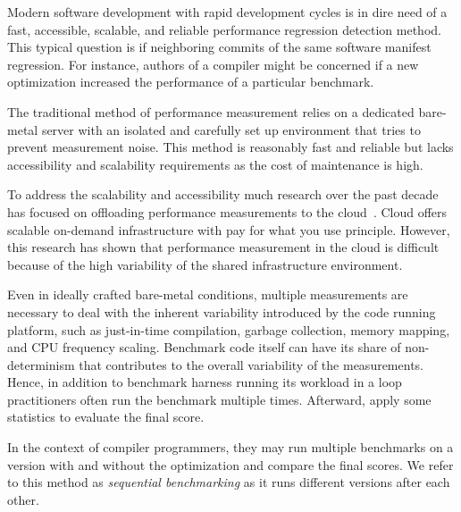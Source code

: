 
Modern software development with rapid development cycles is in dire need of a fast, accessible, scalable, and reliable performance regression detection method.
This typical question is if neighboring commits of the same software manifest regression.
For instance, authors of a compiler might be concerned if a new optimization increased the performance of a particular benchmark.

The traditional method of performance measurement relies on a dedicated bare-metal server with an isolated and carefully set up environment that tries to prevent measurement noise.
This method is reasonably fast and reliable but lacks accessibility and scalability requirements as the cost of maintenance is high.

To address the scalability and accessibility much research over the past decade has focused on offloading performance measurements to the cloud~\cite{leitner2016patterns, laaber2019software, abedi2017conducting}.
Cloud offers scalable \mbox{on-demand} infrastructure with pay for what you use principle.
However, this research has shown that performance measurement in the cloud is difficult because of the high variability of the shared infrastructure environment.

Even in ideally crafted \mbox{bare-metal} conditions, multiple measurements are necessary to deal with the inherent variability introduced by the code running platform, such as \mbox{just-in-time} compilation, garbage collection, memory mapping, and CPU frequency scaling.
Benchmark code itself can have its share of non-determinism that contributes to the overall variability of the measurements.
Hence, in addition to benchmark harness running its workload in a loop practitioners often run the benchmark multiple times.
Afterward, apply some statistics to evaluate the final score.

In the context of compiler programmers, they may run multiple benchmarks on a version with and without the optimization and compare the final scores.
We refer to this method as \emph{sequential benchmarking} as it runs different versions after each other.

